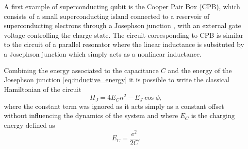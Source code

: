 A first example of superconducting qubit is the Cooper Pair Box (CPB), which consists of a small superconducting island connected to a reservoir of superconducting electrons through a Josephson junction \cite{Vion2002}, with an external gate voltage controlling the charge state.
The circuit corresponding to CPB is similar to the circuit of a parallel resonator where the linear inductance is subsituted by a Josephson junction which simply acts as a nonlinear inductance.

Combining the energy associated to the capacitance $C$ and the energy of the Josephson junction \ref{eq:inductive_energy} it is possible to write the classical Hamiltonian of the circuit
\begin{equation}\label{eq:CPB_hamiltonian}
    H_J = 4E_C n^2 - E_J\cos{\phi},
\end{equation}
where the constant term was ignored as it acts simply as a constant offset without influencing the dynamics of the system and where $E_C$ is the charging energy defined as \begin{equation}\label{eq:charging_energy}
    E_C = \frac{e^2}{2C}.
\end{equation}

